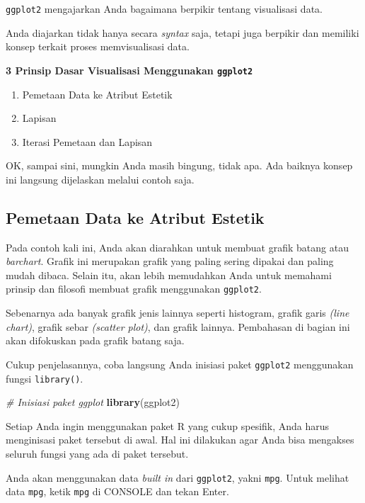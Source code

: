 \documentclass[openany]{book}
\newenvironment{Shaded}{\begin{snugshade}}{\end{snugshade}}
\newcommand{\KeywordTok}[1]{\textcolor[rgb]{0.13,0.29,0.53}{\textbf{#1}}}
\newcommand{\CommentTok}[1]{\textcolor[rgb]{0.56,0.35,0.01}{\textit{#1}}}
\newcommand{\NormalTok}[1]{#1}
\providecommand{\tightlist}{%
  \setlength{\itemsep}{0pt}\setlength{\parskip}{0pt}}
\begin{document}
\texttt{ggplot2} mengajarkan Anda bagaimana berpikir tentang visualisasi
data.

Anda diajarkan tidak hanya secara \emph{syntax} saja, tetapi juga
berpikir dan memiliki konsep terkait proses memvisualisasi data.

\textbf{3 Prinsip Dasar Visualisasi Menggunakan \texttt{ggplot2}}

\begin{enumerate}
\def\labelenumi{\arabic{enumi}.}
\tightlist
\item
  Pemetaan Data ke Atribut Estetik
\item
  Lapisan
\item
  Iterasi Pemetaan dan Lapisan
\end{enumerate}

OK, sampai sini, mungkin Anda masih bingung, tidak apa. Ada baiknya
konsep ini langsung dijelaskan melalui contoh saja.

\subsection{Pemetaan Data ke Atribut
Estetik}\label{pemetaan-data-ke-atribut-estetik}

Pada contoh kali ini, Anda akan diarahkan untuk membuat grafik batang
atau \emph{barchart}. Grafik ini merupakan grafik yang paling sering
dipakai dan paling mudah dibaca. Selain itu, akan lebih memudahkan Anda
untuk memahami prinsip dan filosofi membuat grafik menggunakan
\texttt{ggplot2}.

Sebenarnya ada banyak grafik jenis lainnya seperti histogram, grafik
garis \emph{(line chart)}, grafik sebar \emph{(scatter plot)}, dan
grafik lainnya. Pembahasan di bagian ini akan difokuskan pada grafik
batang saja.

Cukup penjelasannya, coba langsung Anda inisiasi paket \texttt{ggplot2}
menggunakan fungsi \texttt{library()}.

\begin{Shaded}
\begin{Highlighting}[]
\CommentTok{# Inisiasi paket ggplot}
\KeywordTok{library}\NormalTok{(ggplot2)}
\end{Highlighting}
\end{Shaded}

Setiap Anda ingin menggunakan paket R yang cukup spesifik, Anda harus
menginisasi paket tersebut di awal. Hal ini dilakukan agar Anda bisa
mengakses seluruh fungsi yang ada di paket tersebut.

Anda akan menggunakan data \emph{built in} dari \texttt{ggplot2}, yakni
\texttt{mpg}. Untuk melihat data \texttt{mpg}, ketik \texttt{mpg} di
CONSOLE dan tekan Enter.
\end{document}
